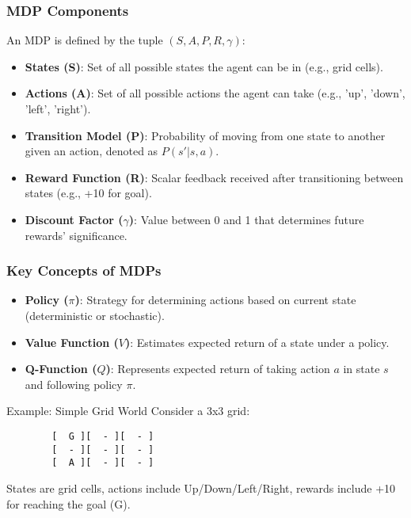 \documentclass[aspectratio=169]{beamer}
\begin{document}
\begin{frame}[fragile]
    \frametitle{MDP Components}
    An MDP is defined by the tuple \( (S, A, P, R, \gamma) \):
    \begin{itemize}
        \item \textbf{States (S)}: Set of all possible states the agent can be in (e.g., grid cells).
        \item \textbf{Actions (A)}: Set of all possible actions the agent can take (e.g., 'up', 'down', 'left', 'right').
        \item \textbf{Transition Model (P)}: Probability of moving from one state to another given an action, denoted as \( P(s'|s,a) \).
        \item \textbf{Reward Function (R)}: Scalar feedback received after transitioning between states (e.g., +10 for goal).
        \item \textbf{Discount Factor (\( \gamma \))}: Value between 0 and 1 that determines future rewards' significance.
    \end{itemize}
\end{frame}

\begin{frame}[fragile]
    \frametitle{Key Concepts of MDPs}
    \begin{itemize}
        \item \textbf{Policy (\( \pi \))}: Strategy for determining actions based on current state (deterministic or stochastic).
        \item \textbf{Value Function (\( V \))}: Estimates expected return of a state under a policy.
        \item \textbf{Q-Function (\( Q \))}: Represents expected return of taking action \( a \) in state \( s \) and following policy \( \pi \).
    \end{itemize}
    \begin{block}{Example: Simple Grid World}
        Consider a 3x3 grid:
        \begin{verbatim}
        [  G ][  - ][  - ]
        [  - ][  - ][  - ]
        [  A ][  - ][  - ]
        \end{verbatim}
        States are grid cells, actions include Up/Down/Left/Right, rewards include +10 for reaching the goal (G).
    \end{block}
\end{frame}
\end{document}
